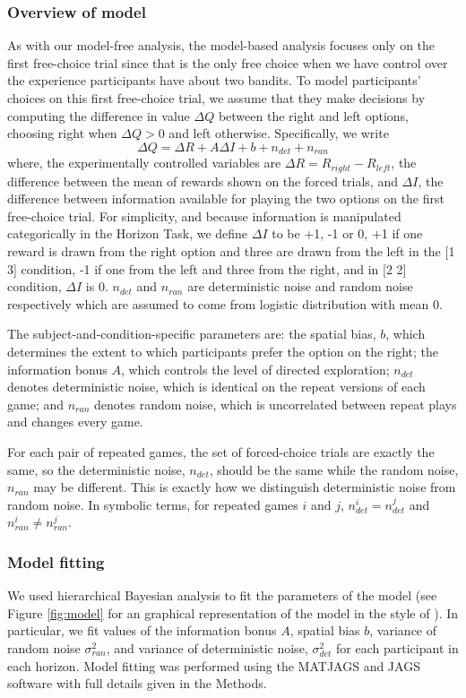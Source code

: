 \documentclass[12pt]{article}
\begin{document}
	\subsubsection*{Overview of model}
	As with our model-free analysis, the model-based analysis focuses only on the first free-choice trial since that is the only free choice when we have control over the experience participants have about two bandits. To model participants' choices on this first free-choice trial, we assume that they make decisions by computing the difference in value $\Delta Q$ between the right and left options, choosing right when $\Delta Q > 0$ and left otherwise.  Specifically, we write
	\begin{equation}
	\Delta Q= \Delta R+A \Delta    I+b+n_{det}+n_{ran}
	\end{equation}
	where, the experimentally controlled variables are $\Delta R=R_{right}-R_{left}$, the difference between the mean of rewards shown on the forced trials, and $\Delta I$, the difference between information available for playing the two options on the first free-choice trial. For simplicity, and because information is manipulated categorically in the Horizon Task, we define $\Delta I$ to be +1, -1 or 0, +1 if one reward is drawn from the right option and three are drawn from the left in the [1 3] condition, -1 if one from the left and three from the right, and in [2 2] condition, $\Delta I$ is 0. $n_{det}$ and $n_{ran}$ are deterministic noise and random noise respectively which are assumed to come from logistic distribution with mean 0.
	
	The subject-and-condition-specific parameters are: the spatial bias, $b$, which determines the extent to which participants prefer the option on the right; the information bonus $A$, which controls the level of directed exploration; $n_{det}$ denotes deterministic noise, which is identical on the repeat versions of each game; and $n_{ran}$ denotes random noise, which is uncorrelated between repeat plays and changes every game.
	
	For each pair of repeated games, the set of forced-choice trials are exactly the same, so the deterministic noise, $n_{det}$, should be the same while the random noise, $n_{ran}$ may be different. This is exactly how we distinguish deterministic noise from random noise. In symbolic terms, for repeated games $i$ and $j$,  $n_{det}^i=n_{det}^j$  and $n_{ran}^i \neq n_{ran}^j$.
	
	
	\subsubsection*{Model fitting}
	We used hierarchical Bayesian analysis to fit the parameters of the model (see Figure \ref{fig:model} for an graphical representation of the model in the style of \cite{lee2014}). In particular, we fit values of the information bonus $A$, spatial bias $b$, variance of random noise $\sigma_{ran}^2$, and variance of deterministic noise, $\sigma_{det}^2$ for each participant in each horizon. Model fitting was performed using the MATJAGS and JAGS software \citep{jags, matjags} with full details given in the Methods.  
	
\end{document}
